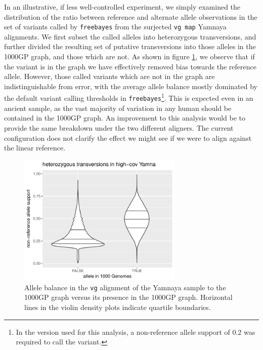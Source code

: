 In an illustrative, if less well-controlled experiment, we simply examined the distribution of the ratio between reference and alternate allele observations in the set of variants called by {\tt freebayes} from the surjected {\tt vg map} Yamnaya alignments.
We first subset the called alleles into heterozygous transversions, and further divided the resulting set of putative transversions into those alleles in the 1000GP graph, and those which are not.
As shown in figure \ref{fig:yamnaya_het_violins}, we observe that if the variant is in the graph we have effectively removed bias towards the reference allele.
However, those called variants which are not in the graph are indistinguishable from error, with the average allele balance mostly dominated by the default variant calling thresholds in {\tt freebayes}\footnote{In the version used for this analysis, a non-reference allele support of 0.2 was required to call the variant.}.
This is expected even in an ancient sample, as the vast majority of variation in any human should be contained in the 1000GP graph.
An improvement to this analysis would be to provide the same breakdown under the two different aligners.
The current configuration does not clarify the effect we might see if we were to align against the linear reference.

\begin{figure}[htbp!]
  \centering
  \includegraphics[width=0.7\textwidth]{Chapter3/Figs/yamna_1000GP_AB_het_violin.pdf}
  \caption[Allele balance in the Yamnaya sample]{
    Allele balance in the {\tt vg} alignment of the Yamnaya sample to the 1000GP graph versus its presence in the 1000GP graph.
    Horizontal lines in the violin density plots indicate quartile boundaries.
  }
  \label{fig:yamnaya_het_violins}
\end{figure}


